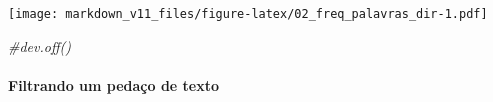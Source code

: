 \documentclass[]{article}
\newenvironment{Shaded}{\begin{snugshade}}{\end{snugshade}}
\newcommand{\KeywordTok}[1]{\textcolor[rgb]{0.13,0.29,0.53}{\textbf{#1}}}
\newcommand{\StringTok}[1]{\textcolor[rgb]{0.31,0.60,0.02}{#1}}
\newcommand{\CommentTok}[1]{\textcolor[rgb]{0.56,0.35,0.01}{\textit{#1}}}
\newcommand{\OperatorTok}[1]{\textcolor[rgb]{0.81,0.36,0.00}{\textbf{#1}}}
\newcommand{\NormalTok}[1]{#1}
\let\oldparagraph\paragraph
\renewcommand{\paragraph}[1]{\oldparagraph{#1}\mbox{}}
\begin{document}
\texttt{[image: markdown\_v11\_files/figure-latex/02\_freq\_palavras\_dir-1.pdf]}

\begin{Shaded}
\begin{Highlighting}[]
\CommentTok{#dev.off()}
\end{Highlighting}
\end{Shaded}

\paragraph{Filtrando um pedaço de
texto}\label{filtrando-um-pedaco-de-texto}

\begin{Shaded}
\end{Shaded}
\end{document}
